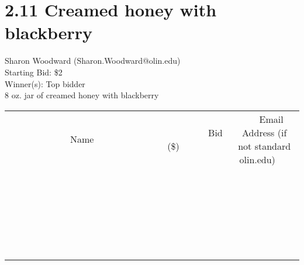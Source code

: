 \documentclass[11pt]{article}
\begin{document}
\section*{2.11 Creamed honey with blackberry}
Sharon Woodward (Sharon.Woodward@olin.edu) \\
Starting Bid: \$2 \\
Winner(s): 
Top bidder \\
8 oz. jar of creamed honey with blackberry \\[6ex]
\begin{tabular}{c c c}
~~~~~~~~~~~~~Name~~~~~~~~~~~~~ & ~~~~~~~~~Bid (\$)~~~~~~~~~ & ~~~Email Address (if not standard olin.edu)~~~ \\
 & & \\
\hline
 & & \\
\hline
 & & \\
\hline
 & & \\
\hline
 & & \\
\hline
 & & \\
\hline
 & & \\
\hline
 & & \\
\hline
 & & \\
\hline
 & & \\
\hline
 & & \\
\hline
 & & \\
\hline
 & & \\
\hline
 & & \\
\hline
 & & \\
\hline
 & & \\
\hline
 & & \\
\hline
 & & \\
\hline
 & & \\
\hline
 & & \\
\hline
 & & \\
\hline
 & & \\
\hline
 & & \\
\hline
 & & \\
\hline
 & & \\
\hline
 & & \\
\hline
\end{tabular}
\clearpage
\end{document}
